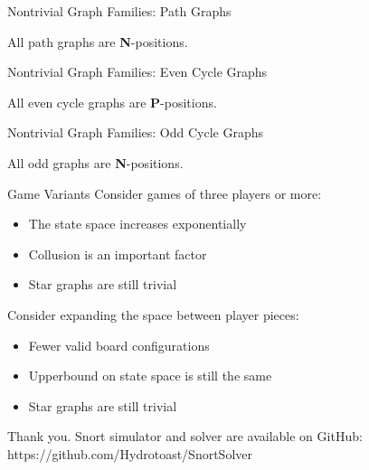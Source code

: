 \documentclass[mathserif]{beamer}
\begin{document}
\begin{frame}{Nontrivial Graph Families: Path Graphs}
	\begin{center}
		All path graphs are \textbf{N}-positions.
	\end{center}
	\vfill
	\begin{figure}[h]
		\centering
		\begin{tikzpicture}
			
		\end{tikzpicture}
	\end{figure}
\end{frame}

\begin{frame}{Nontrivial Graph Families: Even Cycle Graphs}
	\begin{center}
		All even cycle graphs are \textbf{P}-positions.
	\end{center}
	\vfill
	\begin{figure}[h]
		\centering
		\begin{tikzpicture}
			
		\end{tikzpicture}
	\end{figure}
\end{frame}

\begin{frame}{Nontrivial Graph Families: Odd Cycle Graphs}
	\begin{center}
		All odd graphs are \textbf{N}-positions.
	\end{center}
	\vfill
	\begin{figure}[h]
		\centering
		\begin{tikzpicture}
			
		\end{tikzpicture}
	\end{figure}
\end{frame}

\begin{frame}{Game Variants}
	Consider games of three players or more:
	\begin{itemize}
		\item The state space increases exponentially
		\pause
		\item Collusion is an important factor
		\pause
		\item Star graphs are still trivial
	\end{itemize}

	\pause
	\vfill
	Consider expanding the space between player pieces:
	\begin{itemize}
		\item Fewer valid board configurations
		\item Upperbound on state space is still the same
		\pause
		\item Star graphs are still trivial
	\end{itemize}
\end{frame}

\begin{frame}
	\begin{center}
		Thank you. Snort simulator and solver are available on GitHub: https://github.com/Hydrotoast/SnortSolver 
	\end{center}
\end{frame}
\end{document}
